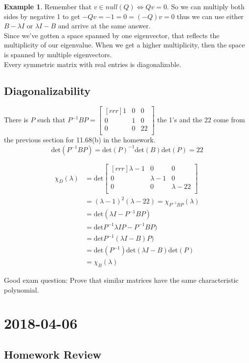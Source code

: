 \documentclass{report}
\theoremstyle{plain}
\theoremstyle{definition}
\newtheorem*{ex}{Example}
\theoremstyle{plain}
\newcommand{\mychapter}[2]{
	\setcounter{chapter}{#1}
	\setcounter{section}{0}
	\chapter*{#2}
	\addcontentsline{toc}{chapter}{#2}
}
\begin{document}
\begin{ex}
Remember that $v\in null(Q) \iff Qv=0$. So we can multiply both sides by negative 1 to get $-Qv=-1=0 = (-Q)v=0$ thus we can use either $B-\lambda I$ or $\lambda I - B$ and arrive at the same answer.\\
Since we've gotten a space spanned by one eigenvector, that reflects the multiplicity of our eigenvalue. When we get a higher multiplicity, then the space is spanned by multiple eigenvectors.\\
Every symmetric matrix with real entries is diagonalizable.

\section{Diagonalizability}
There is $P$ such that $P^{-1}BP=\begin{bmatrix}[rrr]1&0&0\\0&1&0\\0&0&22\\\end{bmatrix}$ the 1's and the 22 come from the previous section for 11.68(b) in the homework.
\[ \mathrm{det}(P^{-1}BP)=\mathrm{det}(P)^{-1}\mathrm{det}(B)\mathrm{det}(P)=22 \]

\begin{align*}
\chi_D(\lambda)&=\mathrm{det}\begin{bmatrix}[rrr]\lambda-1&0&0\\0&\lambda-1&0\\0&0&\lambda-22\\\end{bmatrix}\\
&=(\lambda-1)^2(\lambda-22)
=\chi_{P^{-1}BP}(\lambda)\\
&=\mathrm{det}(\lambda I-P^{-1}BP)\\
&=\mathrm{det}P^{-1}\lambda IP-P^{-1}BP)\\
&= \mathrm{det}P^{-1}(\lambda I-B)P)\\
&= \mathrm{det}(P^{-1})\mathrm{det}(\lambda I-B)\mathrm{det}(P)\\
&= \chi_B(\lambda)
\end{align*}

Good exam question: Prove that similar matrices have the same characteristic polynomial.
\end{ex}
\mychapter{37}{2018-04-06}
\section{Homework Review}
\end{document}
